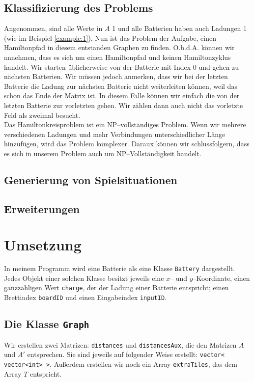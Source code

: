 \documentclass[a4paper,10pt,ngerman]{scrartcl}
\begin{document}
\subsection{Klassifizierung des Problems}
Angenommen, sind alle Werte in $A$ 1 und alle Batterien haben auch Ladungen 1 (wie im Beispiel \ref{example:1}).
Nun ist das Problem der Aufgabe, einen Hamiltonpfad in diesem entstanden Graphen zu finden.
O.b.d.A. können wir annehmen, dass es sich um einen Hamiltonpfad und keinen Hamiltonzyklus handelt.
Wir starten üblicherweise von der Batterie mit Index 0 und gehen zu nächsten Batterien.
Wir müssen jedoch anmerken, dass wir bei der letzten Batterie
die Ladung zur nächsten Batterie nicht weiterleiten können, weil das schon das Ende der Matrix ist.
In diesem Falle können wir einfach die von der letzten Batterie zur vorletzten gehen.
Wir zählen dann auch nicht das vorletzte Feld als zweimal besucht.\\
Das Hamiltonkreisproblem ist ein NP--vollständiges Problem.
Wenn wir mehrere verschiedenen Ladungen und mehr Verbindungen unterschiedlicher Länge hinzufügen, 
wird das Problem komplexer. Daraux können wir schlussfolgern, dass es sich in unserem Problem
auch um NP--Vollständigkeit handelt. 

\subsection{Generierung von Spielsituationen}


\subsection{Erweiterungen}



\newpage
\section{Umsetzung}
In meinem Programm wird eine Batterie als eine Klasse \texttt{Battery} dargestellt.
Jedes Objekt einer solchen Klasse besitzt jeweils eine $x$-- und $y$--Koordinate,
einen ganzzahligen Wert \texttt{charge}, der der Ladung einer Batterie entspricht;
einen Brettindex \texttt{boardID} und einen Eingabeindex \texttt{inputID}.\\

\subsection{Die Klasse \texttt{Graph}}
Wir erstellen zwei Matrizen: \texttt{distances} und \texttt{distancesAux}, die den Matrizen 
$A$ und $A'$ entsprechen. Sie sind jeweils auf folgender Weise erstellt: \texttt{vector< vector<int> >}.
Außerdem erstellen wir noch ein Array \texttt{extraTiles}, das dem Array $T$ entspricht.\\
\end{document}
